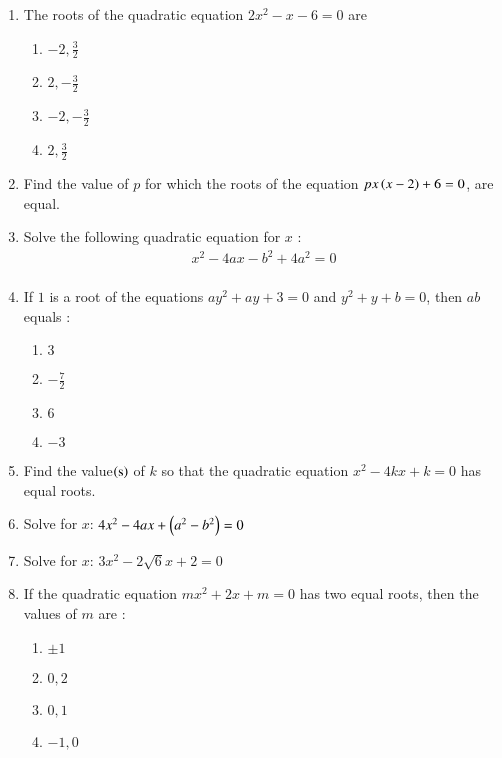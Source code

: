 \begin{enumerate}
\item The roots of the quadratic equation  $2x^2 - x - 6 = 0$ are\\
\begin{enumerate}
\item $-2,\frac{3}{2}$\\
\item $2,-\frac{3}{2}$\\
\item $-2,-\frac{3}{2}$\\
\item $2,\frac{3}{2}$\\
\end{enumerate}
\item Find the value of $p$ for which the roots of the equation $px\left(x-2\right) + 6 = 0$, are equal.\\
\item Solve the following quadratic equation for $x$ :\\
\begin{align}
x^2 - 4 a x - b^2 + 4a^2 = 0\\
\end{align}
\item If $1$ is a root of the equations $ay^2 + ay + 3 = 0$ and $y^2 + y + b = 0$, then $ab$ equals :\\
\begin{enumerate}
\item $3$\\
\item $-\frac{7}{2}$\\
\item $6$\\
\item $-3$\\
\end{enumerate}
\item Find the value$\left(\text{s}\right)$ of $k$ so that the quadratic equation $x^2 - 4kx + k = 0$ has equal roots.\\
\item Solve for $x$: $4x^2 - 4ax + \left(a^2 - b^2\right) = 0$\\
\item Solve for $x$: $3x^2 - 2\sqrt 6 x + 2 = 0$\\
\item If the quadratic equation $mx^2 + 2x + m = 0$ has two equal roots, then the values of $m$ are :\\
\begin{enumerate}
\item $\pm 1$\\
\item $0,2$\\
\item $0,1$\\
\item $-1,0$\\
\end{enumerate}


\end{enumerate}
